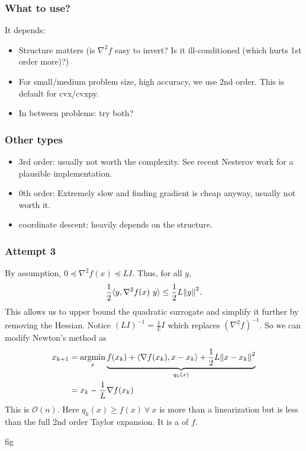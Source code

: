 \documentclass[class=article,crop=false]{standalone}
\begin{document}
\subsubsection{What to use?}
It depends:
\begin{itemize}
	\item Structure matters (is $ \nabla ^2 f$ easy to invert? Is it ill-conditioned (which hurts 1st order more)?)
	\item For small/medium problem size, high accuracy, we use 2nd order. This is default for cvx/cvxpy.
	\item In between problems: try both?
\end{itemize}

\subsubsection{Other types}
\begin{itemize}
	\item 3rd order: usually not worth the complexity. See recent Nesterov work for a plausible implementation.
	\item 0th order: Extremely slow and finding gradient is cheap anyway, usually not worth it.
	\item coordinate descent: heavily depends on the structure.
\end{itemize}

\subsubsection{Attempt 3}
By assumption, $ 0 \preceq \nabla ^2 f(x) \preceq L I$. Thus, for all $ y$,
\[
	\frac{1}{2} \langle y, \nabla ^2 f(x)\ y \rangle \leq \frac{1}{2} L {\left\lVert{ y}\right\rVert}^2 
.\] 
This allows us to upper bound the quadratic surrogate and simplify it further by removing the Hessian. Notice $ (LI) ^{-1} = \frac{1}{L} I$ which replaces $ (\nabla ^2 f)^{-1}$. So we can modify Newton's method as
\begin{align*}
	x_{k+1} &= \operatorname*{argmin}_{x} \underbrace{ f(x_k) + \langle \nabla f(x_k) , x- x_k \rangle + \frac{1}{2} L {\left\lVert{ x -x_k}\right\rVert}^2}_{q_k(x)}\\ 
		&= x_k - \frac{1}{L} \nabla f(x_k)
\end{align*}
This is $ \mathcal{ O}(n)$. Here $ q_k(x) \geq f(x) \ \forall \ x$ is more than a linearization but is less than the full 2nd order Taylor expansion. It is a  of $ f$. 

fig
\end{document}
